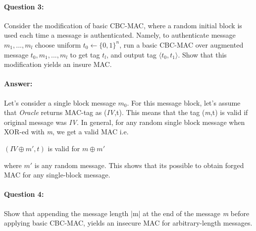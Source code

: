 \documentclass{article}
\begin{document}
    \paragraph{Question 3:} Consider the modification of basic CBC-MAC, where a random initial block is used each time a message is authenticated. Namely, to authenticate message $m_1,...,m_l$ choose uniform $t_0 \leftarrow{{\{0,1\}}^n}$, run a basic CBC-MAC over augmented message $t_0,m_1,...,m_l$ to get tag $t_l$, and output tag $\langle{t_0,t_1}\rangle$. Show that this modification yields an insure MAC.
    \paragraph{Answer: \newline}
        Let's consider a single block message $m_0$. For this message block, let's assume that \emph{Oracle} returns MAC-tag as (\emph{IV},t). This means that the tag (\emph{m},t) is valid if original message was \emph{IV}. \newline
        In general, for any random single block message when XOR-ed with \emph{m}, we get a valid MAC i.e.
        \begin{center}
            $(IV \oplus{m\prime},t)$ is valid for ${m\oplus{m\prime}}$
        \end{center}
        where $m\prime$ is any random message.\newline
        This shows that its possible to obtain forged MAC for any single-block message.

    \paragraph{Question 4:} Show that appending the message length |m| at the end of the message \emph{m} before applying basic CBC-MAC, yields an insecure MAC for arbitrary-length messages.
\end{document}
